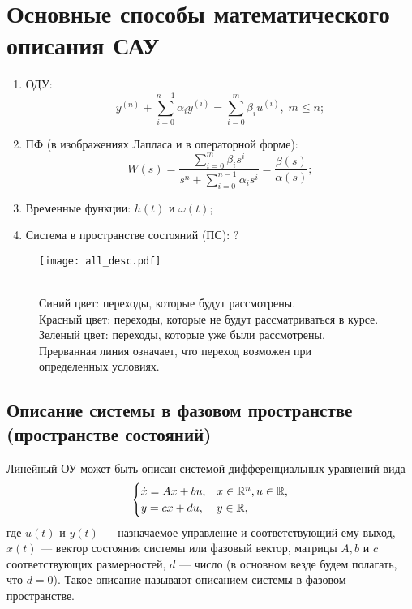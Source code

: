 \documentclass[../../TAU.tex]{subfiles}
\begin{document}
\section{Основные способы математического описания САУ}

    \begin{enumerate}
        \item ОДУ:
            $$
                y^{(n)}+\sum_{i=0}^{n-1}\alpha_iy^{(i)}=\sum_{i=0}^{m}\beta_iu^{(i)},\; m \le n;
            $$
        \item ПФ (в изображениях Лапласа и в операторной форме):
            $$
                W(s) = \frac{\sum_{i=0}^{m}\beta_is^i}{s^n+\sum_{i=0}^{n-1}\alpha_is^{i}} = \frac{\beta(s)}{\alpha(s)};
            $$
        \item Временные функции: $h(t)$ и $\omega(t)$;
        \item Система в пространстве состояний (ПС): ?
    \end{enumerate}

    \begin{center}
    \begin{figure}[H]
        \centering
        \texttt{[image: all\_desc.pdf]}
        \caption
        {    
            {\\\color{blue} Синий цвет}: переходы, которые будут рассмотрены.\\
            {\color{red} Красный цвет}: переходы, которые не будут рассматриваться в курсе.\\
            {\color{green} Зеленый цвет}: переходы, которые уже были рассмотрены.\\
            Прерванная линия означает, что переход возможен при определенных условиях.
        }
    \end{figure}
    \end{center}

\subsection{Описание системы в фазовом пространстве (пространстве состояний)}
    
    Линейный ОУ может быть описан системой дифференциальных уравнений вида
    \begin{equation}\label{ST_DS}
        \begin{cases}
            \dot x = Ax+bu,& x\in\mathbb{R}^{n},u\in\mathbb{R},\\
            y = cx +du,& y\in\mathbb{R},
        \end{cases}
    \end{equation}
    где $u(t)$ и $y(t)$ --- назначаемое управление и соответствующий ему выход, $x(t)$ --- вектор состояния системы или фазовый вектор, матрицы $A,b$ и $c$ соответствующих размерностей, $d$ --- число (в основном везде будем полагать, что ${d=0}$). Такое описание называют описанием системы в фазовом пространстве.
\end{document}

